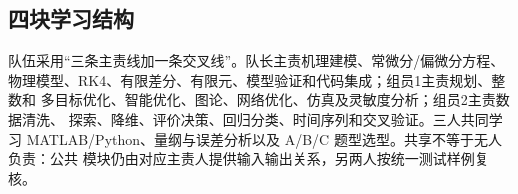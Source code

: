 \subsection{四块学习结构}

队伍采用“三条主责线加一条交叉线”。队长主责机理建模、常微分/偏微分方程、
物理模型、RK4、有限差分、有限元、模型验证和代码集成；组员1主责规划、整数和
多目标优化、智能优化、图论、网络优化、仿真及灵敏度分析；组员2主责数据清洗、
探索、降维、评价决策、回归分类、时间序列和交叉验证。三人共同学习
MATLAB/Python、量纲与误差分析以及 A/B/C 题型选型。共享不等于无人负责：公共
模块仍由对应主责人提供输入输出关系，另两人按统一测试样例复核。

